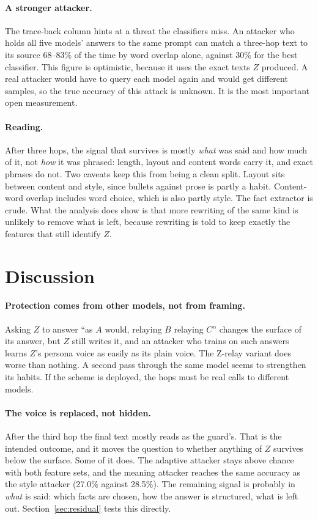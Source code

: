 \documentclass[11pt]{article}
\begin{document}
\paragraph{A stronger attacker.} The trace-back column hints at a threat the classifiers miss. An attacker who holds all five models' answers to the same prompt can match a three-hop text to its source 68--83\% of the time by word overlap alone, against 30\% for the best classifier. This figure is optimistic, because it uses the exact texts $Z$ produced. A real attacker would have to query each model again and would get different samples, so the true accuracy of this attack is unknown. It is the most important open measurement.

\paragraph{Reading.} After three hops, the signal that survives is mostly \emph{what} was said and how much of it, not \emph{how} it was phrased: length, layout and content words carry it, and exact phrases do not. Two caveats keep this from being a clean split. Layout sits between content and style, since bullets against prose is partly a habit. Content-word overlap includes word choice, which is also partly style. The fact extractor is crude. What the analysis does show is that more rewriting of the same kind is unlikely to remove what is left, because rewriting is told to keep exactly the features that still identify $Z$.

\section{Discussion}

\paragraph{Protection comes from other models, not from framing.} Asking $Z$ to answer ``as $A$ would, relaying $B$ relaying $C$'' changes the surface of its answer, but $Z$ still writes it, and an attacker who trains on such answers learns $Z$'s persona voice as easily as its plain voice. The Z-relay variant does worse than nothing. A second pass through the same model seems to strengthen its habits. If the scheme is deployed, the hops must be real calls to different models.

\paragraph{The voice is replaced, not hidden.} After the third hop the final text mostly reads as the guard's. That is the intended outcome, and it moves the question to whether anything of $Z$ survives below the surface. Some of it does. The adaptive attacker stays above chance with both feature sets, and the meaning attacker reaches the same accuracy as the style attacker (27.0\% against 28.5\%). The remaining signal is probably in \emph{what} is said: which facts are chosen, how the answer is structured, what is left out. Section~\ref{sec:residual} tests this directly.
\end{document}
